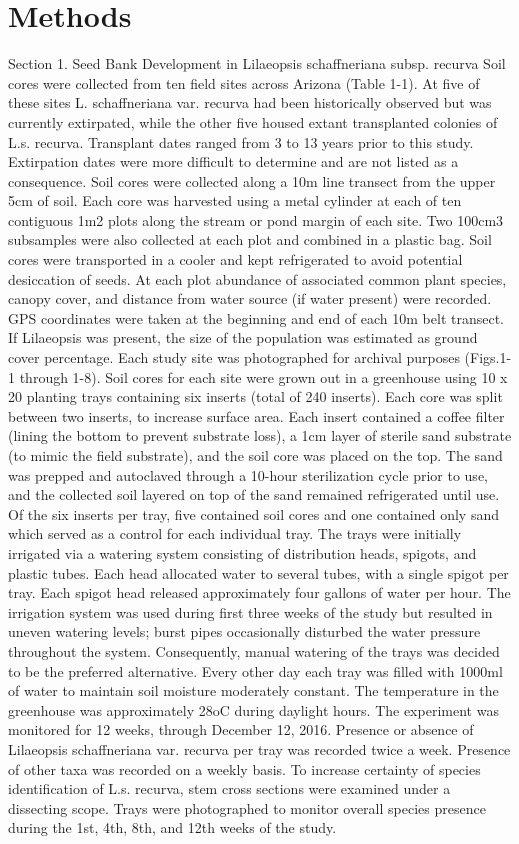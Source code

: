 \documentclass[twocolumn]{article}
\begin{document}
\section{Methods}
Section 1. Seed Bank Development in Lilaeopsis schaffneriana subsp. recurva
Soil cores were collected from ten field sites across Arizona (Table 1-1). At five of these sites L. schaffneriana var. recurva had been historically observed but was currently extirpated, while the other five housed extant transplanted colonies of L.s. recurva. Transplant dates ranged from 3 to 13 years prior to this study. Extirpation dates were more difficult to determine and are not listed as a consequence. Soil cores were collected along a 10m line transect from the upper 5cm of soil. Each core was harvested using a metal cylinder at each of ten contiguous 1m2 plots along the stream or pond margin of each site. Two 100cm3 subsamples were also collected at each plot and combined in a plastic bag. Soil cores were transported in a cooler and kept refrigerated to avoid potential desiccation of seeds. At each plot abundance of associated common plant species, canopy cover, and distance from water source (if water present) were recorded. GPS coordinates were taken at the beginning and end of each 10m belt transect. If Lilaeopsis was present, the size of the population was estimated as ground cover percentage. Each study site was photographed for archival purposes (Figs.1-1 through 1-8). Soil cores for each site were grown out in a greenhouse using 10 x 20 planting trays containing six inserts (total of 240 inserts). Each core was split between two inserts, to increase surface area. Each insert contained a coffee filter (lining the bottom to prevent substrate loss), a 1cm layer of sterile sand substrate (to mimic the field substrate), and the soil core was placed on the top. The sand was prepped and autoclaved through a 10-hour sterilization cycle prior to use, and the collected soil layered on top of the sand remained refrigerated until use. Of the six inserts per tray, five contained soil cores and one contained only sand which served as a control for each individual tray. The trays were initially irrigated via a watering system consisting of distribution heads, spigots, and plastic tubes. Each head allocated water to several tubes, with a single spigot per tray. Each spigot head released approximately four gallons of water per hour. The irrigation system was used during first three weeks of the study but resulted in uneven watering levels; burst pipes occasionally disturbed the water pressure throughout the system. Consequently, manual watering of the trays was decided to be the preferred alternative. Every other day each tray was filled with 1000ml of water to maintain soil moisture moderately constant. The temperature in the greenhouse was approximately 28oC during daylight hours. The experiment was monitored for 12 weeks, through December 12, 2016.  Presence or absence of Lilaeopsis schaffneriana var. recurva per tray was recorded twice a week. Presence of other taxa was recorded on a weekly basis. To increase certainty of species identification of L.s. recurva, stem cross sections were examined under a dissecting scope. Trays were photographed to monitor overall species presence during the 1st, 4th, 8th, and 12th weeks of the study.
\end{document}
